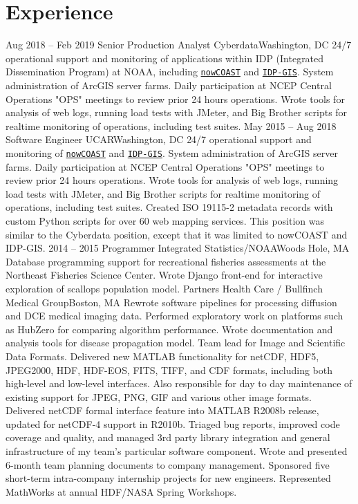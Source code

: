 \documentclass[11pt]{moderncv}  %
\begin{document}
\section{Experience}
\cventry
{Aug 2018 -- Feb 2019}
{Senior Production Analyst}
{Cyberdata}{Washington, DC}{}
{
	24/7 operational support and monitoring of 
	applications within IDP (Integrated Dissemination Program) at
	NOAA, including 
	\href{https://nowcoast.noaa.gov}{\texttt{nowCOAST}}
	and
	\href{https://idpgis.ncep.noaa.gov}{\texttt{IDP-GIS}}.
	System administration of ArcGIS server farms.  Daily
	participation at NCEP Central Operations "OPS" meetings to
	review prior 24 hours operations.  Wrote tools for analysis
	of web logs, running load tests with JMeter, and Big Brother
	scripts for realtime monitoring of operations, including
	test suites.  
}
\cventry
{May 2015 -- Aug 2018}
{Software Engineer}
{UCAR}{Washington, DC}{}
{
	24/7 operational support and monitoring of 
	\href{https://nowcoast.noaa.gov}{\texttt{nowCOAST}}
	and
	\href{https://idpgis.ncep.noaa.gov}{\texttt{IDP-GIS}}.
	System administration of ArcGIS server farms.  Daily
	participation at NCEP Central Operations "OPS" meetings to
	review prior 24 hours operations.  Wrote tools for analysis
	of web logs, running load tests with JMeter, and Big Brother
	scripts for realtime monitoring of operations, including
	test suites.  Created ISO 19115-2 metadata records with
	custom Python scripts for over 60 web mapping services.
	This position was similar to the Cyberdata position, except that
	it was limited to nowCOAST and IDP-GIS.
}
\cventry
{2014 -- 2015}
{Programmer}
{Integrated Statistics/NOAA}{Woods Hole, MA}{}
{
    Database programming support for recreational fisheries assessments
    at the Northeast Fisheries Science Center. Wrote Django front-end
    for interactive exploration of scallops population model.
}
{
	Partners Health Care / Bullfinch Medical Group}{Boston, MA}{}{
    Rewrote software pipelines for processing diffusion and DCE medical
    imaging data.  Performed exploratory work on platforms such as
    HubZero  for comparing algorithm performance. Wrote documentation
    and analysis tools for disease propagation model.
}
{   
    Team lead for Image and Scientific Data Formats.  Delivered
    new MATLAB functionality for netCDF, HDF5, JPEG2000, HDF,
    HDF-EOS, FITS, TIFF, and CDF formats, including both high-level
    and low-level interfaces.  Also responsible for day to day
    maintenance of existing support for JPEG, PNG, GIF and various
    other image formats.  Delivered netCDF formal interface feature
    into MATLAB R2008b release, updated for netCDF-4 support in
    R2010b. Triaged bug reports, improved code coverage and quality,
    and managed 3rd party library integration and general infrastructure
    of my team's particular software component.  Wrote and presented
    6-month team planning documents to company management.  Sponsored
    five short-term intra-company internship projects for new
    engineers.  Represented MathWorks at annual HDF/NASA Spring
    Workshops.
}
\end{document}
